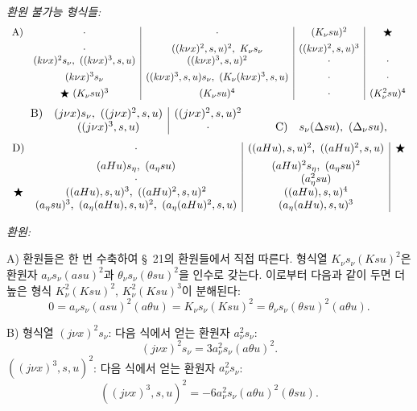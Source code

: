 \noindent\emph{환원 불가능 형식들:}
\[
\begin{array}{c@{\quad}c|c|c|c}
\text{A)}& \cdot & \cdot & (K_\nu su)^2 & \bigstar\\[0.45em]
& \cdot & ((k\nu x)^2,s,u)^2,\ K_\nu s_\nu & ((k\nu x)^2,s,u)^3 & \\
& (k\nu x)^2s_\nu,\ ((k\nu x)^3,s,u) & ((k\nu x)^3,s,u)^2 & \cdot & \cdot\\[0.45em]
& (k\nu x)^3s_\nu & ((k\nu x)^3,s,u)s_\nu,\ (K_\nu(k\nu x)^3,s,u) & \cdot & \cdot\\[0.45em]
& \bigstar\ (K_\nu su)^3 & (K_\nu su)^4 & \cdot & (K_\nu^2su)^4
\end{array}
\]
\[
\begin{array}{c@{\quad}c|c@{\qquad}c@{\quad}c}
\text{B)}& (j\nu x)s_\nu,\ ((j\nu x)^2,s,u) & ((j\nu x)^2,s,u)^2 && \\
& ((j\nu x)^3,s,u) & \cdot && \text{C)}\quad s_\nu(\A su),\ (\A_\nu su),
\end{array}
\]
\[
\begin{array}{c@{\quad}c|c|c}
\text{D)}& \cdot & ((aHu),s,u)^2,\ ((aHu)^2,s,u) & \bigstar\\[0.45em]
& (aHu)s_\eta,\ (a_\eta su) & (aHu)^2s_\eta,\ (a_\eta su)^2 & \\
& \cdot & (a_\eta^2su) & \\
\bigstar& ((aHu),s,u)^3,\ ((aHu)^2,s,u)^2 & ((aHu),s,u)^4 & \\
& (a_\eta su)^3,\ (a_\eta(aHu),s,u)^2,\ (a_\eta(aHu)^2,s,u) & (a_\eta(aHu),s,u)^3 &
\end{array}
\]

\noindent\emph{환원:}

A) 환원들은 한 번 수축하여 \S\ 21의 환원들에서 직접 따른다. 형식열 $K_\nu s_\nu(Ksu)^2$은 환원자 $a_\nu s_\nu(asu)^2$과 $\theta_\nu s_\nu(\theta su)^2$을 인수로 갖는다. 이로부터 다음과 같이 두면 더 높은 형식 $K_\nu^2(Ksu)^2$, $K_\nu^2(Ksu)^3$이 분해된다:
\[
0=a_\nu s_\nu(asu)^2(a\theta u)=K_\nu s_\nu(Ksu)^2=\theta_\nu s_\nu(\theta su)^2(a\theta u).
\]

B) 형식열 $(j\nu x)^2s_\nu$: 다음 식에서 얻는 환원자 $a_\nu^2s_\nu$:
\[
(j\nu x)^2s_\nu=3a_\nu^2s_\nu(a\theta u)^2.
\]
$((j\nu x)^3,s,u)^2$: 다음 식에서 얻는 환원자 $a_\nu^2s_\nu$:
\[
((j\nu x)^3,s,u)^2=-6a_\nu^2s_\nu(a\theta u)^2(\theta su).
\]

